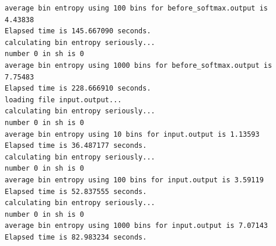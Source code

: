 \documentclass[11pt]{article}
\begin{document}
\begin{verbatim}
average bin entropy using 100 bins for before_softmax.output is 4.43838
Elapsed time is 145.667090 seconds.
calculating bin entropy seriously...
number 0 in sh is 0
average bin entropy using 1000 bins for before_softmax.output is 7.75483
Elapsed time is 228.666910 seconds.
loading file input.output...
calculating bin entropy seriously...
number 0 in sh is 0
average bin entropy using 10 bins for input.output is 1.13593
Elapsed time is 36.487177 seconds.
calculating bin entropy seriously...
number 0 in sh is 0
average bin entropy using 100 bins for input.output is 3.59119
Elapsed time is 52.837555 seconds.
calculating bin entropy seriously...
number 0 in sh is 0
average bin entropy using 1000 bins for input.output is 7.07143
Elapsed time is 82.983234 seconds.
\end{verbatim}
\end{document}
